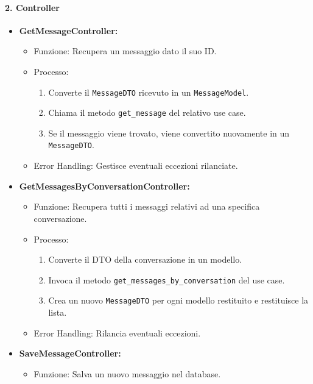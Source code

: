     \paragraph{2. Controller}
    \begin{itemize}
        \item \textbf{GetMessageController:}
        \begin{itemize}
            \item Funzione: Recupera un messaggio dato il suo ID.
            \item Processo:
            \begin{enumerate}
                \item Converte il \texttt{MessageDTO} ricevuto in un \texttt{MessageModel}.
                \item Chiama il metodo \texttt{get\_message} del relativo use case.
                \item Se il messaggio viene trovato, viene convertito nuovamente in un \texttt{MessageDTO}.
            \end{enumerate}
            \item Error Handling: Gestisce eventuali eccezioni rilanciate.
        \end{itemize}
        \item \textbf{GetMessagesByConversationController:}
        \begin{itemize}
            \item Funzione: Recupera tutti i messaggi relativi ad una specifica conversazione.
            \item Processo:
            \begin{enumerate}
                \item Converte il DTO della conversazione in un modello.
                \item Invoca il metodo \texttt{get\_messages\_by\_conversation} del use case.
                \item Crea un nuovo \texttt{MessageDTO} per ogni modello restituito e restituisce la lista.
            \end{enumerate}
            \item Error Handling: Rilancia eventuali eccezioni.
        \end{itemize}
        \item \textbf{SaveMessageController:}
        \begin{itemize}
            \item Funzione: Salva un nuovo messaggio nel database.

\end{itemize}
\end{itemize}
